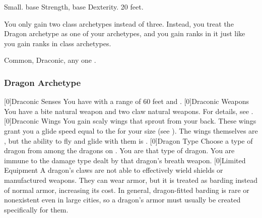          Small.
          base Strength,  base Dexterity.
         20 feet.
        \begin{itemize}
             You only gain two class archetypes instead of three.
                Instead, you treat the Dragon archetype as one of your archetypes, and you gain ranks in it just like you gain ranks in class archetypes.
        \end{itemize}
         Common, Draconic, any one .

        \subsubsection{Dragon Archetype}
            [0]{Draconic Senses} You have   with a range of 60 feet and .
            [0]{Draconic Weapons} You have a bite natural weapon and two claw natural weapons.
                For details, see .
            [0]{Draconic Wings} You gain scaly wings that sprout from your back.
                These wings grant you a glide speed equal to the  for your size (see ).
                The wings themselves are , but the ability to fly and glide with them is .
            [0]{Dragon Type} Choose a type of dragon from among the dragons on .
                You are that type of dragon.
                You are immune to the damage type dealt by that dragon's breath weapon.
            [0]{Limited Equipment} A dragon's claws are not able to effectively wield shields or manufactured weapons.
            They can wear armor, but it is treated as barding instead of normal armor, increasing its cost.
            In general, dragon-fitted barding is rare or nonexistent even in large cities, so a dragon's armor must usually be created specifically for them.

